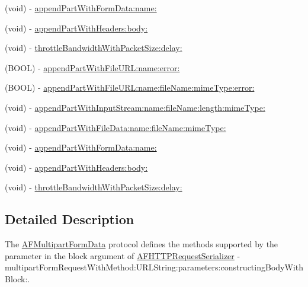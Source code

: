 \begin{DoxyCompactItemize}
(void) -\/ \mbox{\hyperlink{protocol_a_f_multipart_form_data-p_a6bfed0a6d12546d88ecb9ce90c6affb5}{append\+Part\+With\+Form\+Data\+:name\+:}}
\item 
(void) -\/ \mbox{\hyperlink{protocol_a_f_multipart_form_data-p_a536920b65bcc076f33cb823ebb76ecc0}{append\+Part\+With\+Headers\+:body\+:}}
\item 
(void) -\/ \mbox{\hyperlink{protocol_a_f_multipart_form_data-p_a6c60c3d0ab6d679fe548106efc147708}{throttle\+Bandwidth\+With\+Packet\+Size\+:delay\+:}}
\item 
(B\+O\+OL) -\/ \mbox{\hyperlink{protocol_a_f_multipart_form_data-p_ad6dd9d19605afe113ab0f5198224d127}{append\+Part\+With\+File\+U\+R\+L\+:name\+:error\+:}}
\item 
(B\+O\+OL) -\/ \mbox{\hyperlink{protocol_a_f_multipart_form_data-p_a514cde0ae1c0da63a9e5801dabd830b9}{append\+Part\+With\+File\+U\+R\+L\+:name\+:file\+Name\+:mime\+Type\+:error\+:}}
\item 
(void) -\/ \mbox{\hyperlink{protocol_a_f_multipart_form_data-p_aa8e577ad5f3171bf618c12e1ee45b8ab}{append\+Part\+With\+Input\+Stream\+:name\+:file\+Name\+:length\+:mime\+Type\+:}}
\item 
(void) -\/ \mbox{\hyperlink{protocol_a_f_multipart_form_data-p_a47b204592fb8a4ad0750ee4c24baa43f}{append\+Part\+With\+File\+Data\+:name\+:file\+Name\+:mime\+Type\+:}}
\item 
(void) -\/ \mbox{\hyperlink{protocol_a_f_multipart_form_data-p_a6bfed0a6d12546d88ecb9ce90c6affb5}{append\+Part\+With\+Form\+Data\+:name\+:}}
\item 
(void) -\/ \mbox{\hyperlink{protocol_a_f_multipart_form_data-p_a536920b65bcc076f33cb823ebb76ecc0}{append\+Part\+With\+Headers\+:body\+:}}
\item 
(void) -\/ \mbox{\hyperlink{protocol_a_f_multipart_form_data-p_a6c60c3d0ab6d679fe548106efc147708}{throttle\+Bandwidth\+With\+Packet\+Size\+:delay\+:}}
\end{DoxyCompactItemize}


\subsection{Detailed Description}
The {\ttfamily \mbox{\hyperlink{protocol_a_f_multipart_form_data-p}{A\+F\+Multipart\+Form\+Data}}} protocol defines the methods supported by the parameter in the block argument of {\ttfamily \mbox{\hyperlink{interface_a_f_h_t_t_p_request_serializer}{A\+F\+H\+T\+T\+P\+Request\+Serializer}} -\/multipart\+Form\+Request\+With\+Method\+:U\+R\+L\+String\+:parameters\+:constructing\+Body\+With\+Block\+:}. 

